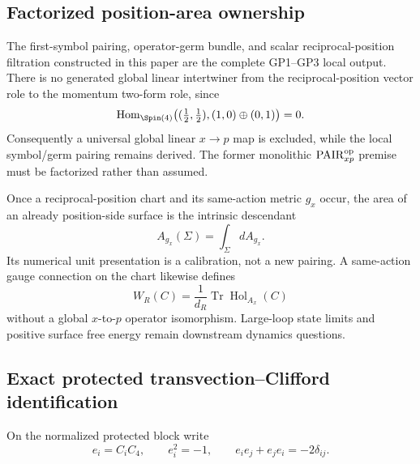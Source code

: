 \documentclass[12pt,a4paper]{article}
\begin{document}
\subsection{Factorized position-area ownership}
\label{p2c:sec:v164-position-area-factorization}

\begin{theorem}
\label{p2c:thm:v164-no-monolithic-pairxp}
The first-symbol pairing, operator-germ bundle, and scalar
reciprocal-position filtration constructed in this paper are the complete
GP1--GP3 local output.  There is no generated global linear intertwiner from
the reciprocal-position vector role to the momentum two-form role, since
\[
 \operatorname{Hom}_{\Spin(4)}
 \bigl((\tfrac12,\tfrac12),(1,0)\oplus(0,1)\bigr)=0.
\]
Consequently a universal global linear \(x\to p\) map is excluded, while the
local symbol/germ pairing remains derived.  The former monolithic
\(\mathrm{PAIR}_{xp}^{\rm op}\) premise must be factorized rather than
assumed.
\end{theorem}

\begin{corollary}
\label{p2c:cor:v164-generated-position-metric-questions}
Once a reciprocal-position chart and its same-action metric \(g_x\) occur,
the area of an already position-side surface is the intrinsic descendant
\[
 A_{g_x}(\Sigma)=\int_\Sigma dA_{g_x}.
\]
Its numerical unit presentation is a calibration, not a new pairing.  A
same-action gauge connection on the chart likewise defines
\[
 W_R(C)=\frac1{d_R}\operatorname{Tr}\operatorname{Hol}_{A_x}(C)
\]
without a global \(x\)-to-\(p\) operator isomorphism.  Large-loop state
limits and positive surface free energy remain downstream dynamics questions.
\end{corollary}


\subsection{Exact protected transvection--Clifford identification}
\label{p2c:sec:v187-transvection-clifford}
On the normalized protected block write
\[
 e_i=C_iC_4,
 \qquad e_i^2=-1,
 \qquad e_ie_j+e_je_i=-2\delta_{ij}.
\]
\end{document}
